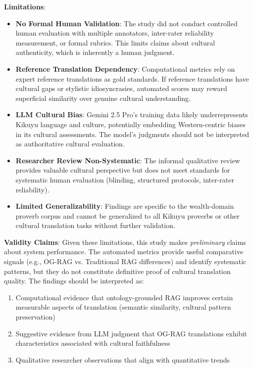 \textbf{Limitations}:
\begin{itemize}
    \item \textbf{No Formal Human Validation}: The study did not conduct controlled human evaluation with multiple annotators, inter-rater reliability measurement, or formal rubrics. This limits claims about cultural authenticity, which is inherently a human judgment.
    
    \item \textbf{Reference Translation Dependency}: Computational metrics rely on expert reference translations as gold standards. If reference translations have cultural gaps or stylistic idiosyncrasies, automated scores may reward superficial similarity over genuine cultural understanding.
    
    \item \textbf{LLM Cultural Bias}: Gemini 2.5 Pro's training data likely underrepresents Kikuyu language and culture, potentially embedding Western-centric biases in its cultural assessments. The model's judgments should not be interpreted as authoritative cultural evaluation.
    
    \item \textbf{Researcher Review Non-Systematic}: The informal qualitative review provides valuable cultural perspective but does not meet standards for systematic human evaluation (blinding, structured protocols, inter-rater reliability).
    
    \item \textbf{Limited Generalizability}: Findings are specific to the wealth-domain proverb corpus and cannot be generalized to all Kikuyu proverbs or other cultural translation tasks without further validation.
\end{itemize}

\textbf{Validity Claims}: Given these limitations, this study makes \emph{preliminary} claims about system performance. The automated metrics provide useful comparative signals (e.g., OG-RAG vs. Traditional RAG differences) and identify systematic patterns, but they do not constitute definitive proof of cultural translation quality. The findings should be interpreted as:

\begin{enumerate}
    \item Computational evidence that ontology-grounded RAG improves certain measurable aspects of translation (semantic similarity, cultural pattern preservation)
    \item Suggestive evidence from LLM judgment that OG-RAG translations exhibit characteristics associated with cultural faithfulness
    \item Qualitative researcher observations that align with quantitative trends
\end{enumerate}

